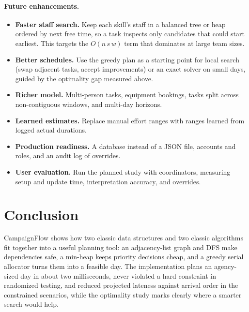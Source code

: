 \documentclass[sigconf,nonacm]{acmart}
\begin{document}
\paragraph{Future enhancements.}
\begin{itemize}
\item \textbf{Faster staff search.} Keep each skill's staff in a balanced tree or heap ordered
  by next free time, so a task inspects only candidates that could start earliest. This targets
  the $O(n\,s\,w)$ term that dominates at large team sizes.
\item \textbf{Better schedules.} Use the greedy plan as a starting point for local search
  (swap adjacent tasks, accept improvements) or an exact solver on small days, guided by the
  optimality gap measured above.
\item \textbf{Richer model.} Multi-person tasks, equipment bookings, tasks split across
  non-contiguous windows, and multi-day horizons.
\item \textbf{Learned estimates.} Replace manual effort ranges with ranges learned from logged
  actual durations.
\item \textbf{Production readiness.} A database instead of a JSON file, accounts and roles,
  and an audit log of overrides.
\item \textbf{User evaluation.} Run the planned study with coordinators, measuring setup and
  update time, interpretation accuracy, and overrides.
\end{itemize}

\section{Conclusion}
CampaignFlow shows how two classic data structures and two classic algorithms fit together
into a useful planning tool: an adjacency-list graph and DFS make dependencies safe, a min-heap
keeps priority decisions cheap, and a greedy serial allocator turns them into a feasible day.
The implementation plans an agency-sized day in about two milliseconds, never violated a hard
constraint in randomized testing, and reduced projected lateness against arrival order in the
constrained scenarios, while the optimality study marks clearly where a smarter search would
help.



\end{document}
